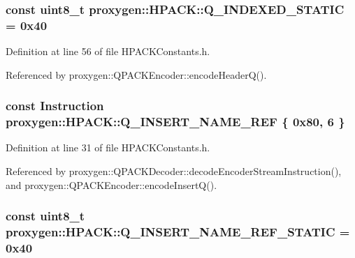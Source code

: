 \subsubsection[{Q\+\_\+\+I\+N\+D\+E\+X\+E\+D\+\_\+\+S\+T\+A\+T\+IC}]{\setlength{\rightskip}{0pt plus 5cm}const uint8\+\_\+t proxygen\+::\+H\+P\+A\+C\+K\+::\+Q\+\_\+\+I\+N\+D\+E\+X\+E\+D\+\_\+\+S\+T\+A\+T\+IC = 0x40}\label{namespaceproxygen_1_1HPACK_a5a2a6995eba642fced24a678a5698e9e}


Definition at line 56 of file H\+P\+A\+C\+K\+Constants.\+h.



Referenced by proxygen\+::\+Q\+P\+A\+C\+K\+Encoder\+::encode\+Header\+Q().

\subsubsection[{Q\+\_\+\+I\+N\+S\+E\+R\+T\+\_\+\+N\+A\+M\+E\+\_\+\+R\+EF}]{\setlength{\rightskip}{0pt plus 5cm}const {\bf Instruction} proxygen\+::\+H\+P\+A\+C\+K\+::\+Q\+\_\+\+I\+N\+S\+E\+R\+T\+\_\+\+N\+A\+M\+E\+\_\+\+R\+EF \{ 0x80, 6 \}}\label{namespaceproxygen_1_1HPACK_a65f106c32170ceac679c6be3ca2a99bc}


Definition at line 31 of file H\+P\+A\+C\+K\+Constants.\+h.



Referenced by proxygen\+::\+Q\+P\+A\+C\+K\+Decoder\+::decode\+Encoder\+Stream\+Instruction(), and proxygen\+::\+Q\+P\+A\+C\+K\+Encoder\+::encode\+Insert\+Q().

\subsubsection[{Q\+\_\+\+I\+N\+S\+E\+R\+T\+\_\+\+N\+A\+M\+E\+\_\+\+R\+E\+F\+\_\+\+S\+T\+A\+T\+IC}]{\setlength{\rightskip}{0pt plus 5cm}const uint8\+\_\+t proxygen\+::\+H\+P\+A\+C\+K\+::\+Q\+\_\+\+I\+N\+S\+E\+R\+T\+\_\+\+N\+A\+M\+E\+\_\+\+R\+E\+F\+\_\+\+S\+T\+A\+T\+IC = 0x40}\label{namespaceproxygen_1_1HPACK_adfbe369b49d68b8ae6e358c104e620e7}


